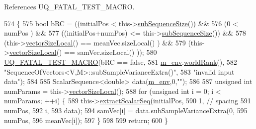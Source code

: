 References U\-Q\-\_\-\-F\-A\-T\-A\-L\-\_\-\-T\-E\-S\-T\-\_\-\-M\-A\-C\-R\-O.


\begin{DoxyCode}
574 \{
575   \textcolor{keywordtype}{bool} bRC = ((initialPos              <  this->\hyperlink{class_q_u_e_s_o_1_1_sequence_of_vectors_a0224bd3e961d86af5d2886301c0c2b86}{subSequenceSize}()) &&
576               (0                       <  numPos                 ) &&
577               ((initialPos+numPos)     <= this->\hyperlink{class_q_u_e_s_o_1_1_sequence_of_vectors_a0224bd3e961d86af5d2886301c0c2b86}{subSequenceSize}()) &&
578               (this->\hyperlink{class_q_u_e_s_o_1_1_base_vector_sequence_a2fefedf9e5b90f22881103b3f92555f6}{vectorSizeLocal}() == meanVec.sizeLocal()    ) &&
579               (this->\hyperlink{class_q_u_e_s_o_1_1_base_vector_sequence_a2fefedf9e5b90f22881103b3f92555f6}{vectorSizeLocal}() == samVec.sizeLocal()     ));
580   \hyperlink{_defines_8h_a56d63d18d0a6d45757de47fcc06f574d}{UQ\_FATAL\_TEST\_MACRO}(bRC == \textcolor{keyword}{false},
581                       \hyperlink{class_q_u_e_s_o_1_1_base_vector_sequence_a8e8824d2a63c5a43bcc6473e3a0491e8}{m\_env}.\hyperlink{class_q_u_e_s_o_1_1_base_environment_a78b57112bbd0e6dd0e8afec00b40ffa7}{worldRank}(),
582                       \textcolor{stringliteral}{"SequenceOfVectors<V,M>::subSampleVarianceExtra()"},
583                       \textcolor{stringliteral}{"invalid input data"});
584 
585   ScalarSequence<double> data(\hyperlink{class_q_u_e_s_o_1_1_base_vector_sequence_a8e8824d2a63c5a43bcc6473e3a0491e8}{m\_env},0,\textcolor{stringliteral}{""});
586 
587   \textcolor{keywordtype}{unsigned} \textcolor{keywordtype}{int} numParams = this->\hyperlink{class_q_u_e_s_o_1_1_base_vector_sequence_a2fefedf9e5b90f22881103b3f92555f6}{vectorSizeLocal}();
588   \textcolor{keywordflow}{for} (\textcolor{keywordtype}{unsigned} \textcolor{keywordtype}{int} i = 0; i < numParams; ++i) \{
589     this->\hyperlink{class_q_u_e_s_o_1_1_sequence_of_vectors_ac977b3b26a6af2ae727671f1246262fd}{extractScalarSeq}(initialPos,
590                            1, \textcolor{comment}{// spacing}
591                            numPos,
592                            i,
593                            data);
594     samVec[i] = data.subSampleVarianceExtra(0,
595                                             numPos,
596                                             meanVec[i]);
597   \}
598 
599   \textcolor{keywordflow}{return};
600 \}
\end{DoxyCode}
